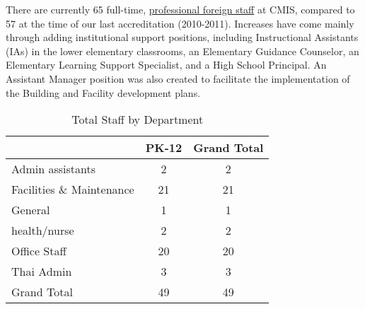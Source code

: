 There are currently 65 full-time, \href{http://cmis.ac.th/about/faculty}{professional foreign staff} at CMIS, compared to 57 at the time of our last accreditation (2010-2011).  Increases have come mainly through adding institutional support positions, including Instructional Assistants (IAs) in the lower elementary classrooms, an Elementary Guidance Counselor, an Elementary Learning Support Specialist, and a High School Principal.  An Assistant Manager position was also created to facilitate the implementation of the Building and Facility development plans.  

\begin{table}[h]
\caption{Total Staff by Department}
\label{table:7}
\begin{tabu}{|X|c|c|}
\hline
&
PK-12 &
Grand Total \\
\hline
Admin assistants &
2 &
2 \\
\hline
Facilities \& Maintenance &
21 &
21 \\
\hline
General &
1 &
1 \\
\hline
health/nurse &
2 &
2 \\
\hline
Office Staff &
20 &
20 \\
\hline
Thai Admin &
3 &
3 \\
\hline
Grand Total &
49 &
49 \\
\hline
\end{tabu}
\end{table}


